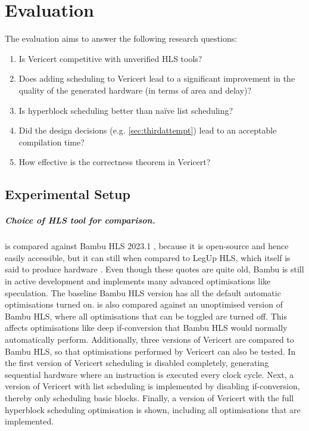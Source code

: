 \graphicspath{{./figures/5-hyperblock-scheduling/}}

\chapter{Evaluation}%
\label{sec:evaluation}%
\label{sec:performance-comparison}

The evaluation aims to answer the following research questions:

\begin{enumerate}[label=\textbf{RQ\arabic*}]
\item Is Vericert competitive with unverified HLS tools?
\item Does adding scheduling to Vericert lead to a significant improvement in
  the quality of the generated hardware (in terms of area and delay)?
\item Is hyperblock scheduling better than na\"ive list scheduling?
\item Did the design decisions (e.g. \cref{sec:thirdattempt}) lead to an
  acceptable compilation time?
\item How effective is the correctness theorem in Vericert?
\end{enumerate}

\section{Experimental Setup}

\def\polybench{PolyBench/C}

\paragraph{Choice of HLS tool for comparison.} \vericert{} is compared against
Bambu HLS 2023.1 \cite{ferrandi21_bambu}, because it is open-source and hence
easily accessible, but it can still
 when compared to LegUp HLS, which itself is said to produce
hardware .  Even though these quotes are quite
old, Bambu is still in active development and implements many advanced
optimisations like speculation.  The baseline Bambu HLS version has all the
default automatic optimisations turned on.  \vericert{} is also compared against
an unoptimised version of Bambu HLS, where all optimisations that can be toggled
are turned off.  This affects optimisations like deep \gls{if-conversion} that Bambu
HLS would normally automatically perform.  Additionally, three versions of
Vericert are compared to Bambu HLS, so that optimisations performed by Vericert
can also be tested.  In the first version of Vericert scheduling is disabled
completely, generating sequential hardware where an instruction is executed
every clock cycle.  Next, a version of Vericert with list scheduling is
implemented by disabling if-conversion, thereby only scheduling basic blocks.
Finally, a version of Vericert with the full hyperblock scheduling optimisation
is shown, including all optimisations that are implemented.

